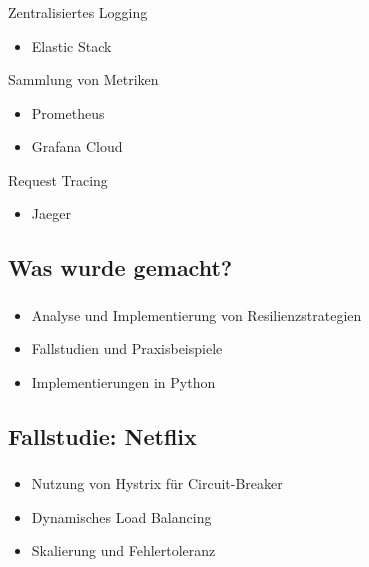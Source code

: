 \begin{frame}
	\frametitle{\insertsection}
    \framesubtitle{\insertsubsection}
    
    \vspace*{-0.5cm}
    
    \begin{block}{Zentralisiertes Logging}
    	\begin{itemize}
    		\item Elastic Stack
    	\end{itemize}
    \end{block}

	\begin{block}{Sammlung von Metriken}
    	\begin{itemize}
    		\item Prometheus
    		\item Grafana Cloud
    	\end{itemize}
    \end{block}
    
    \begin{block}{Request Tracing}
    	\begin{itemize}
    		\item Jaeger
    	\end{itemize}
    \end{block}

\end{frame}


\subsection{Was wurde gemacht?}

\begin{frame}
    \frametitle{\insertsection}
    \framesubtitle{\insertsubsection}

    \begin{itemize}
        \item Analyse und Implementierung von Resilienzstrategien
        \item Fallstudien und Praxisbeispiele
        \item Implementierungen in Python
    \end{itemize}
\end{frame}

\subsection{Fallstudie: Netflix}
\begin{frame}
    \frametitle{\insertsection}
    \framesubtitle{\insertsubsection}

    \begin{itemize}
        \item Nutzung von Hystrix für Circuit-Breaker
        \item Dynamisches Load Balancing
        \item Skalierung und Fehlertoleranz
    \end{itemize}
\end{frame}

